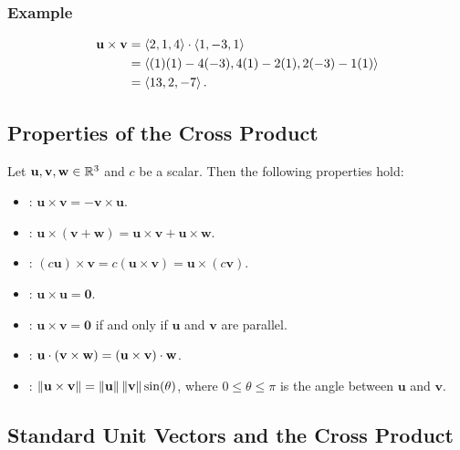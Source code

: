 \subsubsection{Example}

\begin{align*}
    \mathbf{u} \times \mathbf{v} &= \left\langle 2,1,4 \right\rangle \cdot \left\langle 1,-3,1 \right\rangle \\
    &= \left\langle (1)(1) - 4(-3), 4(1) - 2(1), 2(-3) - 1(1) \right\rangle \\
    &= \left\langle 13,2,-7 \right\rangle.
\end{align*}

\subsection{Properties of the Cross Product}

Let \(\mathbf{u}, \mathbf{v}, \mathbf{w} \in \mathbb{R}^{3}\) and \(c\) be a scalar. Then the following properties hold:
\begin{itemize}
    \item {}: \(\mathbf{u} \times \mathbf{v} = -\mathbf{v} \times \mathbf{u}\).
    \item {}: \(\mathbf{u} \times (\mathbf{v} + \mathbf{w}) = \mathbf{u} \times \mathbf{v} + \mathbf{u} \times \mathbf{w}\).
    \item {}: \((c\mathbf{u}) \times \mathbf{v} = c(\mathbf{u} \times \mathbf{v}) = \mathbf{u} \times (c\mathbf{v})\).
    \item {}: \(\mathbf{u} \times \mathbf{u} = \mathbf{0}\).
    \item {}: \(\mathbf{u} \times \mathbf{v} = \mathbf{0}\) if and only if \(\mathbf{u}\) and \(\mathbf{v}\) are parallel.
    \item {}: \(\mathbf{u} \cdot (\mathbf{v} \times \mathbf{w}) = (\mathbf{u} \times \mathbf{v}) \cdot \mathbf{w}\).
    \item {}: \(\left\lVert \mathbf{u \times v}\right\rVert = \left\lVert \mathbf{u}\right\rVert\left\lVert \mathbf{v}\right\rVert\sin(\theta)\), where \(0 \leq \theta \leq \pi\) is the angle between \(\mathbf{u}\) and \(\mathbf{v}\).
\end{itemize}

\subsection{Standard Unit Vectors and the Cross Product}

